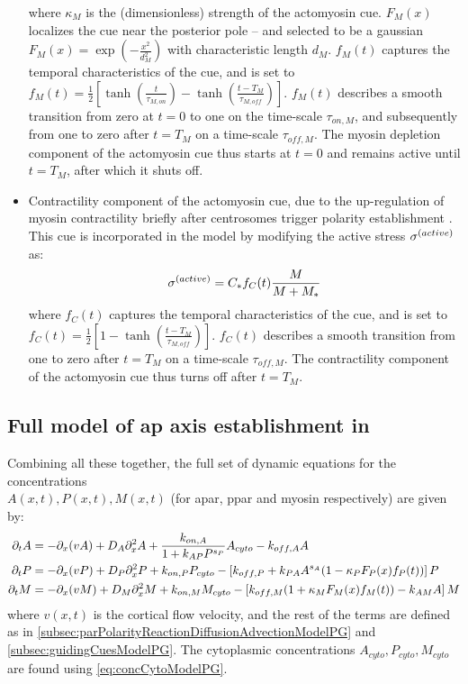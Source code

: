 \begin{itemize}
    where $\kappa_M$ is the (dimensionless) strength of the actomyosin cue. $F_M(x)$ localizes the cue near the posterior pole -- and selected to be a gaussian $F_M(x) = \exp(-\frac{x^2}{d_M^2})$ with characteristic length $d_M$. $f_M(t)$ captures the temporal characteristics of the cue, and is set to $f_M(t) = \frac{1}{2}\left[\tanh(\frac{t}{\tau_{M,on}}) - \tanh(\frac{t - T_M}{\tau_{M,off}})\right]$. $f_M(t)$ describes a smooth transition from zero at $t = 0$ to one on the time-scale $\tau_{on,M}$, and subsequently from one to zero after $t = T_M$ on a time-scale $\tau_{off,M}$. The myosin depletion component of the actomyosin cue thus starts at $t = 0$ and remains active until $t = T_M$, after which it shuts off.
    \item Contractility component of the actomyosin cue, due to the up-regulation of myosin contractility briefly after centrosomes trigger polarity establishment \citep{tse2012nop1}. This cue is incorporated in the model by modifying the active stress $\sigma^{(active)}$ as:
    \begin{equation}\label{eq:activeStressWithCueModelPG}
        \sigma^{(active)} = C_*f_C(t)\frac{M}{M + M_*}
    \end{equation}
    where $f_C(t)$ captures the temporal characteristics of the cue, and is set to $f_C(t) = \frac{1}{2}\left[1 - \tanh(\frac{t-T_M}{\tau_{M,off}})\right]$. $f_C(t)$ describes a smooth transition from one to zero after $t = T_M$ on a time-scale $\tau_{off,M}$. The contractility component of the actomyosin cue thus turns off after $t = T_M$.
\end{itemize}

\subsection{Full model of \acs{ap} axis establishment in \citep{gross2019guiding}}\label{subsec:fullModelPG}
Combining all these together, the full set of dynamic equations for the concentrations\\ $A(x,t),P(x,t),M(x,t)$ (for \ac{apar}, \ac{ppar} and myosin respectively) are given by:
\begin{subequations}\label{eq:allConcDynamicsModelPG}
    \begin{align}
        \inlinePartial{t}{A} &= -\inlinePartial{x}{(vA)} + D_A\inlinePartial[2]{x}{A} + \frac{k_{on,A}}{1 + k_{AP}P^{s_P}}A_{cyto} - k_{off,A}A\\
        \inlinePartial{t}{P} &= -\inlinePartial{x}{(vP)} + D_P\inlinePartial[2]{x}{P} + k_{on,P}P_{cyto} - \left[k_{off,P} + k_{PA}A^{s_A}(1 - \kappa_PF_P(x)f_P(t))\right]P\\
        \inlinePartial{t}{M} &= -\inlinePartial{x}{(vM)} + D_M\inlinePartial[2]{x}{M} + k_{on,M}M_{cyto} - \left[k_{off,M}(1 + \kappa_MF_M(x)f_M(t)) - k_{AM}A\right]M
    \end{align}
\end{subequations}
where $v(x,t)$ is the cortical flow velocity, and the rest of the terms are defined as in \autoref{subsec:parPolarityReactionDiffusionAdvectionModelPG} and \autoref{subsec:guidingCuesModelPG}. The cytoplasmic concentrations $A_{cyto}, P_{cyto}, M_{cyto}$ are found using \autoref{eq:concCytoModelPG}.

